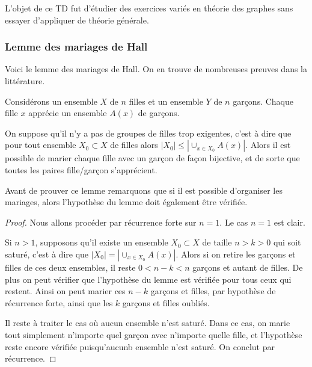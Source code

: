 
L'objet de ce TD fut d'étudier des exercices variés en théorie des graphes sans essayer d'appliquer de théorie générale.

\subsubsection{Lemme des mariages de Hall}

Voici le lemme des mariages de Hall. On en trouve de nombreuses preuves dans la littérature.

\begin{lem}
Considérons un ensemble $X$ de $n$ filles et un ensemble $Y$ de $n$ garçons. Chaque fille $x$ apprécie un ensemble $A(x)$ de garçons.
\smallskip

 On suppose qu'il n'y a pas de groupes de filles trop exigentes, c'est à dire que pour tout ensemble $X_0\subset X$ de filles alors $|X_0|\leq |\cup_{x\in X_0} A(x)|$. Alors il est possible de marier chaque fille avec un garçon de façon bijective, et de sorte que toutes les paires fille/garçon s'apprécient.
\end{lem}

Avant de prouver ce lemme remarquons que si il est possible d'organiser les mariages, alors l'hypothèse du lemme doit également être vérifiée.

\begin{proof}

Nous allons procéder par récurrence forte sur $n=1$. Le cas $n=1$ est clair.

\medskip

Si $n>1$, supposons qu'il existe un ensemble $X_0\subset X$ de taille $n>k>0$ qui soit saturé, c'est à dire que $|X_0|=|\cup_{x\in X_0}A(x)|$. Alors si on retire les garçons et filles de ces deux ensembles, il reste $0<n-k<n$ garçons et autant de filles. De plus on peut vérifier que l'hypothèse du lemme est vérifiée pour tous ceux qui restent. Ainsi on peut marier ces $n-k$ garçons et filles, par hypothèse de récurrence forte, ainsi que les $k$ garçons et filles oubliés.

Il reste à traiter le cas où aucun ensemble n'est saturé. Dans ce cas, on marie tout simplement n'importe quel garçon avec n'importe quelle fille, et l'hypothèse reste encore vérifiée puisqu'aucunb ensemble n'est saturé. On conclut par récurrence.
\end{proof}

